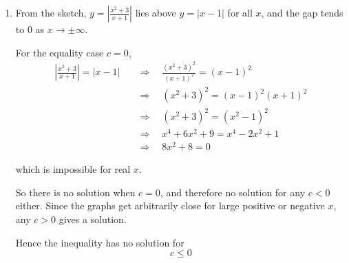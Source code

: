 \documentclass[leqno]{article}
\begin{document}
\begin{enumerate}[
  label=\textbf{\arabic*.},
  leftmargin=*,
  topsep=0pt,
  partopsep=0pt,
  parsep=0pt
]
\begin{djsSolution}
\begin{enumerate}[label=\textbf{(\alph*)}]
\begin{enumerate}[label=(\roman*)]
    Here
    \[
    C_1:\ y=\left|\frac{x^2+3}{x+1}\right|,
    \qquad
    C_2:\ y=|x-1|
    \]

    For $C_1$, the part of the original curve with $x<-1$ is reflected in the $x$-axis. The right-hand branch is unchanged.

    Its intersections with the axes are:
    \[
    y=\left|\frac{0^2+3}{0+1}\right|=3
    \]

    so the $y$-intercept is $(0,3)$.

    There is no $x$-intercept, since $x^2+3>0$ for all real $x$.

    Also, $C_1$ has vertical asymptote $x=-1$, and its oblique asymptotes are
    \[
    y=1-x \quad \text{as } x\to -\infty,
    \qquad
    y=x-1 \quad \text{as } x\to \infty
    \]

    For $C_2:y=|x-1|$:
    \[
    |x-1|=0\quad\Longrightarrow\quad x=1
    \]

    so the $x$-intercept is $(1,0)$, and
    \[
    y=|0-1|=1
    \]

    so the $y$-intercept is $(0,1)$.

    \item From the sketch, $y=\left|\frac{x^2+3}{x+1}\right|$ lies above $y=|x-1|$ for all $x$, and the gap tends to $0$ as $x\to \pm\infty$.

    For the equality case $c=0$,
    \begin{align*}
    \left|\frac{x^2+3}{x+1}\right|=|x-1|
    &\quad\Longrightarrow\quad \frac{(x^2+3)^2}{(x+1)^2}=(x-1)^2\\
    &\quad\Longrightarrow\quad (x^2+3)^2=(x-1)^2(x+1)^2\\
    &\quad\Longrightarrow\quad (x^2+3)^2=(x^2-1)^2\\
    &\quad\Longrightarrow\quad x^4+6x^2+9=x^4-2x^2+1\\
    &\quad\Longrightarrow\quad 8x^2+8=0
    \end{align*}

    which is impossible for real $x$.

    So there is no solution when $c=0$, and therefore no solution for any $c<0$ either. Since the graphs get arbitrarily close for large positive or negative $x$, any $c>0$ gives a solution.

    Hence the inequality has no solution for
    \[
    c\le 0
    \]
  \end{enumerate}
\end{enumerate}
\end{djsSolution}



\end{enumerate}
\end{document}
